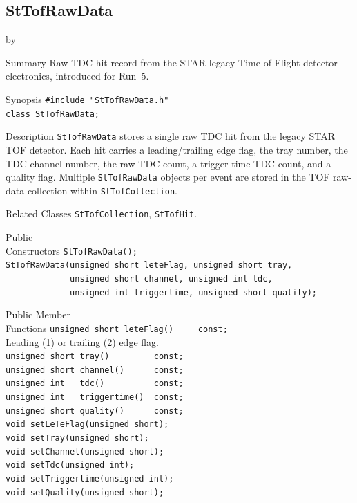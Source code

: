 \documentclass[twoside]{article}
\newcommand{\entrylabel}[1]{\mbox{\textbf{{#1}}}\hfil}%
\newenvironment{entry}
{\begin{list}{}%
    {\renewcommand{\makelabel}{\entrylabel}%
     \setlength{\labelwidth}{90pt}%
     \setlength{\leftmargin}{\labelwidth}
     \advance\leftmargin by \labelsep%
      }%
    }%
  {\end{list}}
\newcommand{\Entrylabel}[1]%
{\raisebox{0pt}[1ex][0pt]{\makebox[\labelwidth][l]%
    {\parbox[t]{\labelwidth}{\hspace{0pt}\textbf{{#1}}}}}}
\newenvironment{Entry}%
{\renewcommand{\entrylabel}{\Entrylabel}\begin{entry}}%
  {\end{entry}}
\begin{document}
\subsection{StTofRawData}
\label{sec:StTofRawData}
\begin{Entry}
\item[Summary]
    Raw TDC hit record from the STAR legacy Time of Flight detector
    electronics, introduced for Run~5.

\item[Synopsis]
    \verb+#include "StTofRawData.h"+\\
    \verb+class StTofRawData;+\\

\item[Description]
    \texttt{StTofRawData} stores a single raw TDC hit from the legacy STAR
    TOF detector.  Each hit carries a leading/trailing edge flag, the tray
    number, the TDC channel number, the raw TDC count, a trigger-time TDC
    count, and a quality flag.  Multiple \texttt{StTofRawData} objects per
    event are stored in the TOF raw-data collection within
    \texttt{StTofCollection}.

\item[Related Classes]
    \texttt{StTofCollection}, \texttt{StTofHit}.

\item[Public\\ Constructors]
    \verb+StTofRawData();+\\
    \verb+StTofRawData(unsigned short leteFlag, unsigned short tray,+\\
    \verb+             unsigned short channel, unsigned int tdc,+\\
    \verb+             unsigned int triggertime, unsigned short quality);+\\

\item[Public Member\\ Functions]
    \verb+unsigned short leteFlag()     const;+\\
        Leading (1) or trailing (2) edge flag.\\
    \verb+unsigned short tray()         const;+\\
    \verb+unsigned short channel()      const;+\\
    \verb+unsigned int   tdc()          const;+\\
    \verb+unsigned int   triggertime()  const;+\\
    \verb+unsigned short quality()      const;+\\
    \verb+void setLeTeFlag(unsigned short);+\\
    \verb+void setTray(unsigned short);+\\
    \verb+void setChannel(unsigned short);+\\
    \verb+void setTdc(unsigned int);+\\
    \verb+void setTriggertime(unsigned int);+\\
    \verb+void setQuality(unsigned short);+\\
\end{Entry}
\clearpage
\end{document}
